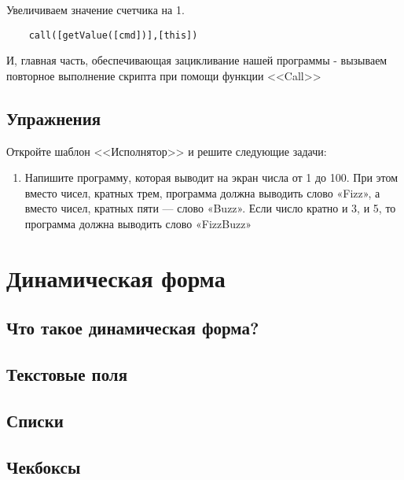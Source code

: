 \documentclass[10pt]{book}
\begin{document}
	Увеличиваем значение счетчика на 1.
	
	\begin{verbatim}
	call([getValue([cmd])],[this])
	\end{verbatim}
	
	И, главная часть, обеспечивающая зацикливание нашей программы - вызываем повторное выполнение скрипта при помощи функции
	<<Call>>
	
	\section{Упражнения}
	
	Откройте шаблон <<Исполнятор>> и решите следующие задачи:
	
	\begin{enumerate}
	\item Напишите программу, которая выводит на экран числа от 1 до 100. При этом вместо чисел, кратных трем, программа должна выводить слово «Fizz», а вместо чисел, кратных пяти — слово «Buzz». Если число кратно и 3, и 5, то программа должна выводить слово «FizzBuzz»
	
	\end{enumerate}
	
	\chapter{Динамическая форма}
	
	\section{Что такое динамическая форма?}
	
	\section{Текстовые поля}
	
	\section{Списки}
	
	\section{Чекбоксы}
	
\end{document}
